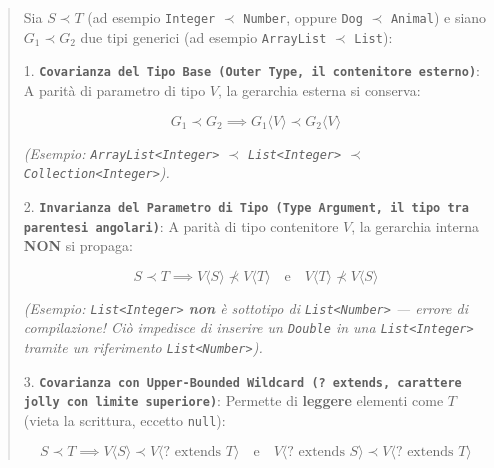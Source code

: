 \begin{quote}\small

Sia $S \prec T$ (ad esempio \texttt{Integer} $\prec$ \texttt{Number}, oppure \texttt{Dog} $\prec$ \texttt{Animal}) e siano $G_1 \prec G_2$ due tipi generici (ad esempio \texttt{ArrayList} $\prec$ \texttt{List}):



1. \textbf{\texttt{Covarianza del Tipo Base (Outer Type, il contenitore esterno)}}: A parità di parametro di tipo $V$, la gerarchia esterna si conserva:



   \[

   G_1 \prec G_2 \implies G_1\langle V \rangle \prec G_2\langle V \rangle

\]



   \emph{(Esempio: \texttt{ArrayList<Integer>} $\prec$ \texttt{List<Integer>} $\prec$ \texttt{Collection<Integer>}).}



2. \textbf{\texttt{Invarianza del Parametro di Tipo (Type Argument, il tipo tra parentesi angolari)}}: A parità di tipo contenitore $V$, la gerarchia interna \textbf{NON} si propaga:



   \[

   S \prec T \implies V\langle S \rangle \not\prec V\langle T \rangle \quad \text{e} \quad V\langle T \rangle \not\prec V\langle S \rangle

\]



   \emph{(Esempio: \texttt{List<Integer>} \textbf{non} è sottotipo di \texttt{List<Number>} — errore di compilazione! Ciò impedisce di inserire un \texttt{Double} in una \texttt{List<Integer>} tramite un riferimento \texttt{List<Number>}).}



3. \textbf{\texttt{Covarianza con Upper-Bounded Wildcard (? extends, carattere jolly con limite superiore)}}: Permette di \textbf{leggere} elementi come $T$ (vieta la scrittura, eccetto \texttt{null}):



   \[

   S \prec T \implies V\langle S \rangle \prec V\langle ? \text{ extends } T \rangle \quad \text{e} \quad V\langle ? \text{ extends } S \rangle \prec V\langle ? \text{ extends } T \rangle

\]




\end{quote}
